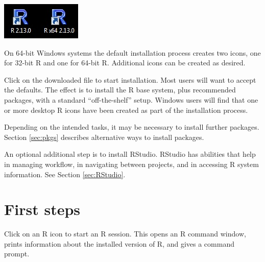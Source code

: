 \documentclass{tufte-book}\usepackage[]{graphicx}\usepackage[]{color}
\begin{document}
\begin{marginfigure}
\begin{center}
\begin{minipage}[c]{0.8\textwidth}
\includegraphics{figs-inc/01i-icons.jpg}
\end{minipage}
\end{center}
\caption{On 64-bit Windows systems the default installation
process creates two icons, one for 32-bit R and one for 64-bit R.
Additional icons can be created as desired.
}
\end{marginfigure}

Click on the downloaded file to start installation.  Most users will
want to accept the defaults.  The effect is to install the R base
system, plus recommended packages, with a standard ``off-the-shelf''
setup.  Windows users will find that one or more desktop R icons have
been created as part of the installation process.

Depending on the intended tasks, it may be necessary to install
further packages. Section \ref{sec:pkgs} describes alternative
ways to install packages.

An optional additional step is to install RStudio.
  RStudio has abilities that
help in managing workflow, in navigating between projects, and in
accessing R system information.  See Section \ref{sec:RStudio}.

\section{First steps}\label{sec:step1}

Click on an R icon to start an R session.  This opens an R command
window, prints information about the installed version of R, and
gives a command prompt.
\end{document}
